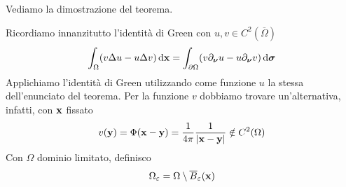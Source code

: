 Vediamo la dimostrazione del teorema.
\begin{dimostrazione}
    Ricordiamo innanzitutto l'identità di Green con $\displaystyle u,v\in C^{2}(\overline{\Omega })$
    \begin{equation*}
        \int _{\Omega }(v\Delta u-u\Delta v) \dxx =\int _{\partial \Omega }(v\partial _{\nuu} u-u\partial _{\nuu} v) \dsig
    \end{equation*}
    Applichiamo l'identità di Green utilizzando come funzione $u$ la stessa dell'enunciato del teorema. Per la funzione $v$ dobbiamo trovare un'alternativa, infatti, con $\x$ fissato
    \begin{equation*}
        v(\y) =\Phi (\x -\y) =\frac{1}{4\pi }\frac{1}{| \x -\y| } \notin C^{2}(\Omega)
    \end{equation*}
    Con $\displaystyle \Omega $ dominio limitato, definisco
    \begin{equation*}
        \Omega _{\varepsilon } =\Omega \setminus \overline{B}_{\varepsilon }(\x)
    \end{equation*}
    \begin{figure}[H]
        \centering

        \begin{tikzpicture}[x=0.75pt,y=0.75pt,yscale=-1,xscale=1]


\end{tikzpicture}
\end{figure}
\end{dimostrazione}
